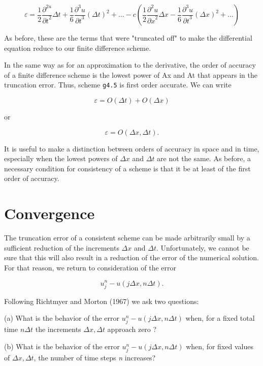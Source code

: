     \[\varepsilon = \frac{1}{2}\frac{\partial^{2u}}{{\partial t}^{2}}\Delta t
+ \frac{1}{6}\frac{\partial^{3}u}{{\partial t}^{3}}\left( \Delta t \right)^{2} +\ldots-
c(\frac{1}{2}\frac{\partial^{2}u}{{\partial x}^{2}}\Delta x -
\frac{1}{6}\frac{\partial^{3}u}{{\partial t}^{3}}\left( \Delta x \right)^{2}
+\ldots )\]

As before, these are the terms that were "truncated off" to make the
differential equation reduce to our finite difference scheme.

In the same way as for an approximation to the derivative, the order of
accuracy of a finite difference scheme is the lowest power of Ax and At
that appears in the truncation error. Thus, scheme \texttt{g4.5} is
first order accurate. We can write

\[\varepsilon = O \left( \Delta t \right) + O\left( \Delta x \right)\]

or

\[\varepsilon = O \left( \Delta x,\Delta t \right).\]

It is useful to make a distinction between orders of accuracy in space
and in time, especially when the lowest powers of \(\Delta x\) and
\(\Delta t\) are not the same. As before, a necessary condition for
consistency of a scheme is that it be at least of the first order of
accuracy.

\section{Convergence}\label{sec:convergence}

The truncation error of a consistent scheme can be made arbitrarily
small by a sufficient reduction of the increments \(\Delta x\) and
\(\Delta t\). Unfortunately, we cannot be sure that this will also
result in a reduction of the error of the numerical solution. For that
reason, we return to consideration of the error

\[u_j^n-u\left( j\Delta x,n\Delta t \right).\]

Following Richtmyer and Morton (1967) we ask two questions:

(a) What is the behavior of the error
\(u_{j}^{n} - u\left( j\Delta x,n\Delta t \right)\) when, for a fixed
total time \(n \Delta t\) the increments \(\Delta x , \Delta t\)
approach zero ?

(b) What is the behavior of the error
\(u_{j}^{n} - u\left( j\Delta x,n\Delta t \right)\) when, for fixed
values of \(\Delta x, \Delta t\), the number of time steps \emph{n}
increases?

